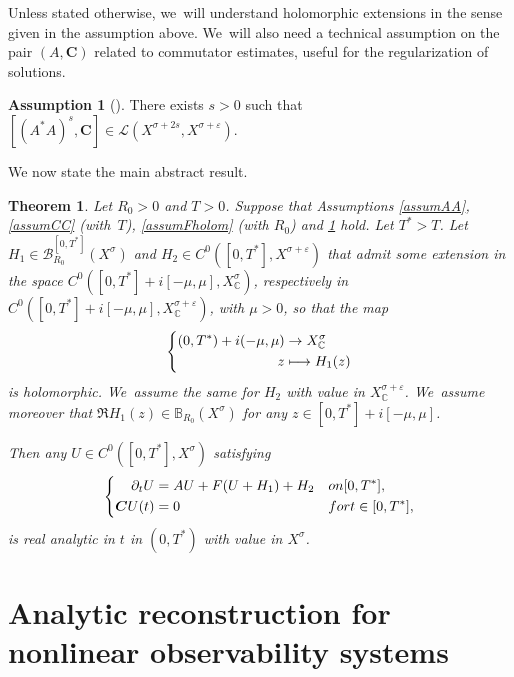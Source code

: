 \documentclass[11pt]{article}
\newcommand\mto{\mathchoice{\longmapsto}{\mapsto}{\mapsto}{\mapsto}}
\newtheorem{theorem}{Theorem}[section]
\theoremstyle{definition}
\newtheorem{assum}{Assumption}
\newenvironment{assump}[2][]
{\renewcommand\theassum{#2}\begin{assum}[#1]}
{\end{assum}}
\let\mc\mathcal
\let\veps\varepsilon
\newcommand{\B}{\mc{B}}
\newcommand{\bC}{\boldsymbol{C}}
\begin{document}
Unless stated otherwise, we~will understand holomorphic extensions in the sense given in the assumption above. We~will also need a technical assumption on the pair $(A, \bC)$ related to commutator estimates, useful for the regularization of solutions.
\begin{assump}{4}
\label{assumcommu}
There exists $s>0$ such that $[(A^*A)^s,\bC]\in \mc{L}(X^{\sigma+2s}, X^{\sigma+\veps})$.
\end{assump}

We now state the main abstract result.

\begin{theorem}\label{thmabstractanalyticintro}
Let $R_{0}\!>\!0$ and $T\!>\!0$. Suppose that Assumptions \ref{assumAA}, \ref{assumCC} (with~$T$), \ref{assumFholom} (with $R_{0}$) and \ref{assumcommu} hold. Let $T^{*}\!>\!T$. Let $H_{1}\in \B_{R_{0}}^{[0,T^{*}]}(X^{\sigma})$ and $H_{2}\in C^{0}([0,T^{*}],X^{\sigma+\veps})$ that admit some extension in the space $C^{0}([0,T^{*}]+i[-\mu,\mu],X^{\sigma}_{\mathbb{C}})$, respectively in \hbox{$C^{0}([0,T^{*}]+i[-\mu,\mu],X^{\sigma+\veps}_{\mathbb{C}})$}, with $\mu\!>\!0$, so that the map
\begin{align*}
\left\{\begin{aligned}
(0,T^{*})+i(-\mu,\mu) & \to X^{\sigma}_{\mathbb{C}}\\
z&\mto H_{1}(z)
\end{aligned}\right.
\end{align*}
is holomorphic. We~assume the same for $H_{2}$ with value in $X^{\sigma+\veps}_{\mathbb{C}}$. We~assume moreover that $\Re H_{1}(z)\in \mathbb{B}_{R_0}(X^{\sigma})$ for any $z\in [0,T^{*}]+i[-\mu,\mu]$.

Then any $U\in C^{0}([0,T^{*}],X^{\sigma})$ satisfying
\begin{align}\label{UCabstractT*intro}
\left\{\begin{aligned}
\partial_t U&=AU+F(U+H_{1})+H_{2}&& \textnormal{ on } [0,T^{*}], \\
\bC U(t)&=0 &&\textnormal{ for }t\in [0,T^{*}],
\end{aligned}\right.
\end{align}
is real analytic in $t$ in $(0,T^*)$ with value in $X^{\sigma}$.
\end{theorem}



\section{Analytic reconstruction for nonlinear observability systems}\label{sec:abstract-construction}
\end{document}

